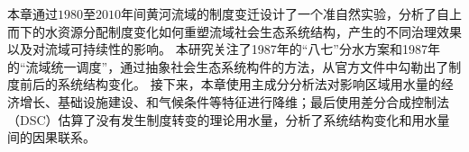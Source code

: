 

本章通过$1980$至$2010$年间黄河流域的制度变迁设计了一个准自然实验，分析了自上而下的水资源分配制度变化如何重塑流域社会\textendash{}生态系统结构，产生的不同治理效果以及对流域可持续性的影响。
本研究关注了1987年的``八七''分水方案和1987年的“流域统一调度”，通过抽象社会\textendash{}生态系统构件的方法，从官方文件中勾勒出了制度前后的系统结构变化。
接下来，本章使用主成分分析法对影响区域用水量的经济增长、基础设施建设、和气候条件等特征进行降维；最后使用差分合成控制法（DSC）\cite{arkhangelsky2021}估算了没有发生制度转变的理论用水量，分析了系统结构变化和用水量间的因果联系。
